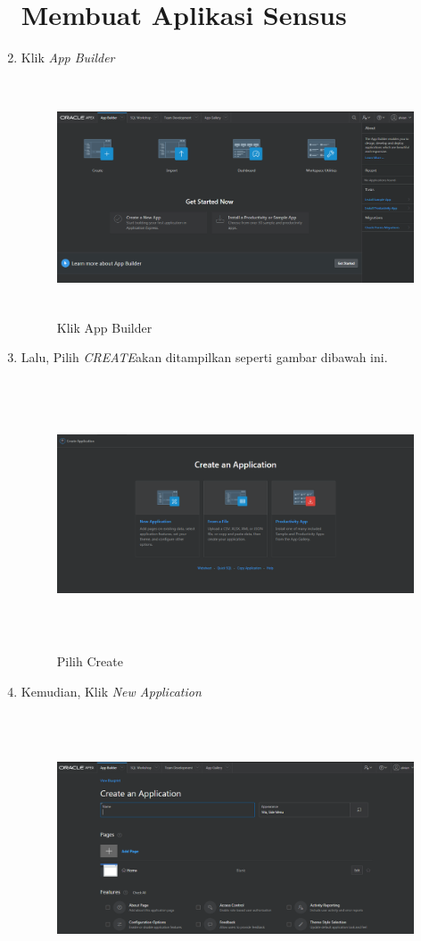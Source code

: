 \begin{enumerate}
\section{Membuat Aplikasi Sensus}
\par
\item Klik \textit{App Builder}
\begin{figure}[!htbp]
\centering
\includegraphics[width=13cm,height=7cm]{figures/app.PNG}
\caption{Klik App Builder}
\label{penanda}
\end{figure}
\item Lalu, Pilih \textit{CREATE}akan ditampilkan seperti gambar dibawah ini.
\begin{figure}[!htbp]
\centering
\includegraphics[width=13cm,height=8cm]{figures/H2.PNG}
\caption{Pilih Create}
\label{penanda}
\end{figure}
\item Kemudian, Klik \textit{New Application} 
\begin{figure}[!htbp]
\centering
\includegraphics[width=13cm,height=8cm]{figures/H3.PNG}

\end{figure}
\end{enumerate}

